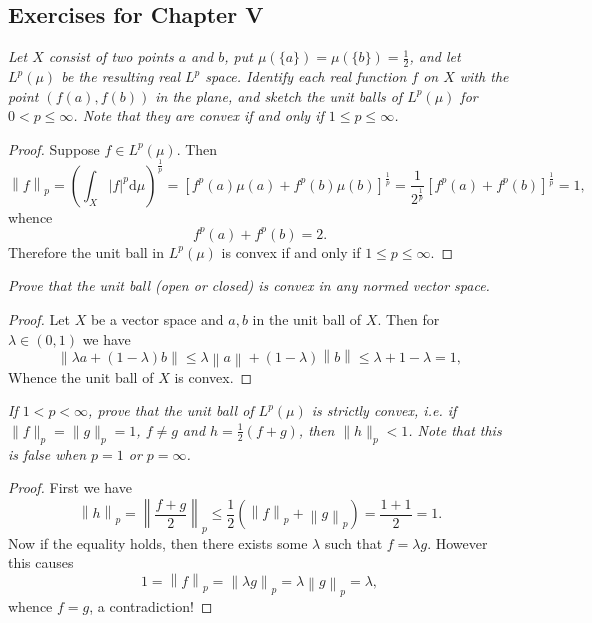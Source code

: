 \subsection{Exercises for Chapter V}
\begin{problem}\em
Let $X$ consist of two points $a$ and $b$, put $\mu(\{a\})=\mu(\{b\})=\frac{1}{2}$, and let $L^p(\mu)$ be the resulting real $L^p$ space. Identify each real function $f$ on $X$ with the point $(f(a),f(b))$ in the plane, and sketch the unit balls of $L^p(\mu)$ for $0<p\le\infty$. Note that they are convex if and only if $1\le p\le\infty$.
\end{problem}
\begin{proof}
Suppose $f\in L^p(\mu)$. Then 
$$
\left\| f \right\| _p=\left( \int_X{\left| f \right|^p\mathrm{d}\mu} \right) ^{\frac{1}{p}}=\left[ f^p\left( a \right) \mu \left( a \right) +f^p\left( b \right) \mu \left( b \right) \right] ^{\frac{1}{p}}=\frac{1}{2^{\frac{1}{p}}}\left[ f^p\left( a \right) +f^p\left( b \right) \right] ^{\frac{1}{p}}=1,
$$
whence 
$$
f^p\left( a \right) +f^p\left( b \right) =2.
$$
Therefore the unit ball in $L^p(\mu)$ is convex if and only if $1\le p\le\infty$.
\end{proof}
\begin{problem}\em
Prove that the unit ball (open or closed) is convex in any normed vector space.
\end{problem}
\begin{proof}
Let $X$ be a vector space and $a,b$ in the unit ball of $X$. Then for $\lambda\in(0,1)$ we have 
$$
\left\| \lambda a+\left( 1-\lambda \right) b \right\| \le \lambda \left\| a \right\| +\left( 1-\lambda \right) \left\| b \right\| \le\lambda +1-\lambda =1,
$$
Whence the unit ball of $X$ is convex.
\end{proof}
\begin{problem}\em
If $1<p<\infty$, prove that the unit ball of $L^p(\mu)$ is strictly convex, i.e. if $\|f\|_p=\|g\|_p=1$, $f\ne g$ and $h=\frac{1}{2}(f+g)$, then $\|h\|_p<1$. Note that this is false when $p=1$ or $p=\infty$.
\end{problem}
\begin{proof}
First we have 
$$
\left\| h \right\| _p=\left\| \frac{f+g}{2} \right\| _p\le \frac{1}{2}\left( \left\| f \right\| _p+\left\| g \right\| _p \right) =\frac{1+1}{2}=1.
$$
Now if the equality holds, then there exists some $\lambda$ such that $f=\lambda g$. However this causes 
$$
1=\left\| f \right\| _p=\left\| \lambda g \right\| _p=\lambda \left\| g \right\| _p=\lambda ,
$$
whence $f=g$, a contradiction!
\end{proof}
